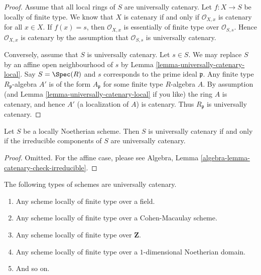 \begin{proof}
Assume that all local rings of $S$ are universally catenary.
Let $f : X \to S$ be locally of finite type.
We know that $X$ is catenary if and only if $\mathcal{O}_{X, x}$ is
catenary for all $x \in X$. If $f(x) = s$, then $\mathcal{O}_{X, x}$
is essentially of finite type over $\mathcal{O}_{S, s}$. Hence
$\mathcal{O}_{X, x}$ is catenary by the assumption that
$\mathcal{O}_{S, s}$ is universally catenary.

\medskip\noindent
Conversely, assume that $S$ is universally catenary. Let $s \in S$.
We may replace $S$ by an affine open neighbourhood of $s$ by
Lemma \ref{lemma-universally-catenary-local}. Say $S = \Spec(R)$
and $s$ corresponds to the prime ideal $\mathfrak p$. Any finite
type $R_{\mathfrak p}$-algebra $A'$ is of the form
$A_{\mathfrak p}$ for some finite type $R$-algebra $A$.
By assumption (and Lemma \ref{lemma-universally-catenary-local} if you like)
the ring $A$ is catenary, and hence $A'$ (a localization of $A$) is
catenary. Thus $R_{\mathfrak p}$ is universally catenary.
\end{proof}

\begin{lemma}
\label{lemma-catenary-check-irreducible}
Let $S$ be a locally Noetherian scheme. Then $S$ is universally catenary
if and only if the irreducible components of $S$ are universally catenary.
\end{lemma}

\begin{proof}
Omitted. For the affine case, please see
Algebra, Lemma \ref{algebra-lemma-catenary-check-irreducible}.
\end{proof}

\begin{lemma}
\label{lemma-ubiquity-uc}
The following types of schemes are universally catenary.
\begin{enumerate}
\item Any scheme locally of finite type over a field.
\item Any scheme locally of finite type over a Cohen-Macaulay scheme.
\item Any scheme locally of finite type over $\mathbf{Z}$.
\item Any scheme locally of finite type over a $1$-dimensional
Noetherian domain.
\item And so on.
\end{enumerate}
\end{lemma}

